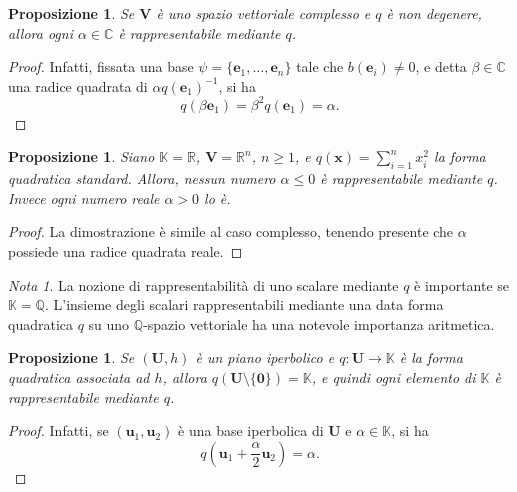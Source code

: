 \documentclass{article}
\theoremstyle{plain}
\newtheorem{prop}[thm]{Proposizione}
\theoremstyle{definition}
\theoremstyle{remark}
\newtheorem{note}{Nota}
\begin{document}
\vspace{10pt}

\begin{bxthm}
\begin{prop}
Se $\mathbf{V}$ è uno spazio vettoriale complesso e $q$ è non degenere, allora ogni 
$\alpha \in \mathbb{C}$ è rappresentabile mediante $q$. 
\end{prop}
\end{bxthm}
\begin{proof}
Infatti, fissata una base $\psi=\{\mathbf{e}_1, \ldots, \mathbf{e}_n\}$ tale che 
$b(\mathbf{e}_i) \neq 0$, e detta $\beta \in \mathbb{C}$ una radice quadrata di $\alpha q(\mathbf{e}_1)^{-1}$, si ha
\[q(\beta \mathbf{e}_1) = \beta^2 q(\mathbf{e}_1) = \alpha.\]    
\end{proof}

\vspace{10pt}

\begin{bxthm}
\begin{prop}
Siano $\mathbb{K} = \mathbb{R}$, $\mathbf{V} = \mathbb{R}^n$, $n \geq 1$, e $q(\mathbf{x}) = \sum_{i=1}^{n}x_i^2$
la forma quadratica standard. Allora, nessun numero $\alpha \leq 0$ è rappresentabile 
mediante $q$. Invece ogni numero reale $\alpha > 0$ lo è.
\end{prop}
\end{bxthm}
\begin{proof}
    La dimostrazione è simile al caso complesso, tenendo presente che $\alpha$ possiede una radice quadrata reale.
\end{proof}

\vspace{10pt}

\begin{note}
La nozione di rappresentabilità di uno scalare mediante $q$ è importante se $\mathbb{K} = \mathbb{Q}$. 
L'insieme degli scalari rappresentabili mediante una data forma quadratica $q$ su uno $\mathbb{Q}$-spazio vettoriale 
ha una notevole importanza aritmetica.
\end{note}

\vspace{10pt}

\begin{bxthm}
\begin{prop}\label{quindicidiecicinque}
Se $(\mathbf{U}, h)$ è un piano iperbolico e $q: \mathbf{U} \to \mathbb{K}$ è la forma quadratica 
associata ad $h$, allora $q(\mathbf{U} \setminus \{\mathbf{0}\}) = \mathbb{K}$, e quindi ogni elemento 
di $\mathbb{K}$ è rappresentabile mediante $q$. 
\end{prop}
\end{bxthm}
\begin{proof}
Infatti, se $(\mathbf{u}_1, \mathbf{u}_2)$ è una base 
iperbolica di $\mathbf{U}$ e $\alpha \in \mathbb{K}$, si ha \[q\left(\mathbf{u}_1 + \frac{\alpha}{2} \mathbf{u}_2\right) = \alpha.\]
\end{proof}
\end{document}
